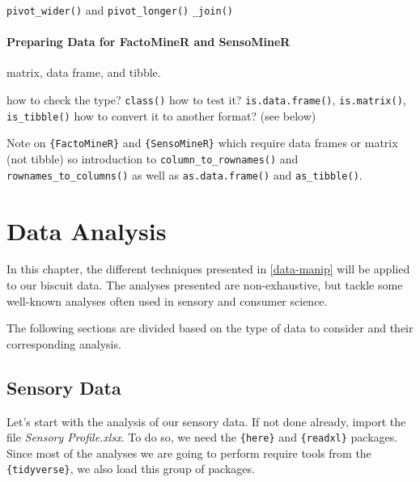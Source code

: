 \documentclass[
]{book}
\begin{document}
\texttt{pivot\_wider()} and \texttt{pivot\_longer()}
\texttt{\_join()}

\hypertarget{preparing-data-for-factominer-and-sensominer}{%
\subsubsection{Preparing Data for FactoMineR and SensoMineR}\label{preparing-data-for-factominer-and-sensominer}}

matrix, data frame, and tibble.

how to check the type? \texttt{class()}
how to test it? \texttt{is.data.frame()}, \texttt{is.matrix()}, \texttt{is\_tibble()}
how to convert it to another format? (see below)

Note on \texttt{\{FactoMineR\}} and \texttt{\{SensoMineR\}} which require data frames or matrix (not tibble) so introduction to \texttt{column\_to\_rownames()} and \texttt{rownames\_to\_columns()} as well as \texttt{as.data.frame()} and \texttt{as\_tibble()}.

\hypertarget{data-analysis}{%
\chapter{Data Analysis}\label{data-analysis}}

In this chapter, the different techniques presented in \ref{data-manip} will be applied to our biscuit data.
The analyses presented are non-exhaustive, but tackle some well-known analyses often used in sensory and consumer science.

The following sections are divided based on the type of data to consider and their corresponding analysis.

\hypertarget{sensory-data}{%
\section{Sensory Data}\label{sensory-data}}

Let's start with the analysis of our sensory data. If not done already, import the file \emph{Sensory Profile.xlsx}.
To do so, we need the \texttt{\{here\}} and \texttt{\{readxl\}} packages. Since most of the analyses we are going to perform require tools from the \texttt{\{tidyverse\}}, we also load this group of packages.
\end{document}
